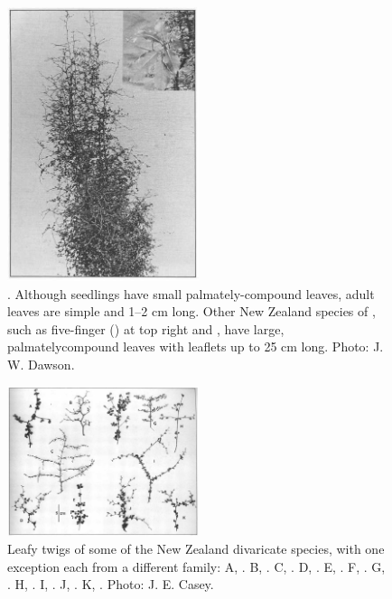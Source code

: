 \begin{figure}
	\includegraphics[width=0.5\textwidth]{graphics/figure76pseudopanax.jpg}
	\centering
	\caption[\emph{Pseudopanax anomalus}]{.
	Although seedlings have small palmately-compound leaves, adult leaves are simple and 1--2 cm long.
	Other New Zealand species of , such as five-finger () at top right and , have large, palmatelycompound leaves with leaflets up to 25 cm long. Photo:  J. W. Dawson.}%
	\label{fig:76pseudopanax}
\end{figure}

\begin{figure}
	\includegraphics[width=0.5\textwidth]{graphics/figure77twigs.jpg}
	\centering
	\caption[Leafy twigs of some of the New Zealand divaricate species]{Leafy twigs of some of the New Zealand divaricate species, with one exception each from a different family: A, .
	B, .
	C, .
	D, .
	E, .
	F, .
	G, .
	H, .
	I, .
	J, .
	K, .
	Photo:  J. E. Casey.}%
	\label{fig:77twigs}
\end{figure}

